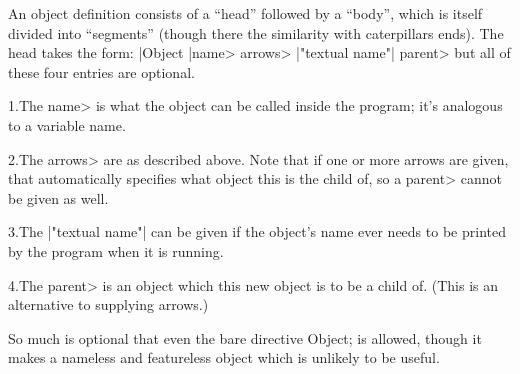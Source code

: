 An object definition consists of a ``head'' followed by a ``body'', which is
itself divided into ``segments'' (though there the similarity with caterpillars
ends).  The head takes the form:
\begindisplay
    |Object |\<name> \<arrows> |"textual name"| \<parent>\cr
\enddisplay
but all of these four entries are optional.
\item{1.}The \<name> is what the object can be called inside the program;
it's analogous to a variable name.
\item{2.}The \<arrows> are as described above.  Note that if one or more
arrows are given, that automatically specifies what object this is the child
of, so a \<parent> cannot be given as well.
\item{3.}The |"textual name"| can be given if the object's name ever needs
to be printed by the program when it is running.
\item{4.}The \<parent> is an object which this new object is to be a child
of.  (This is an alternative to supplying arrows.)
\medskip\par\noindent
So much is optional that even the bare directive
\beginstt
    Object;
\endtt
is allowed, though it makes a nameless and featureless object
which is unlikely to be useful.



